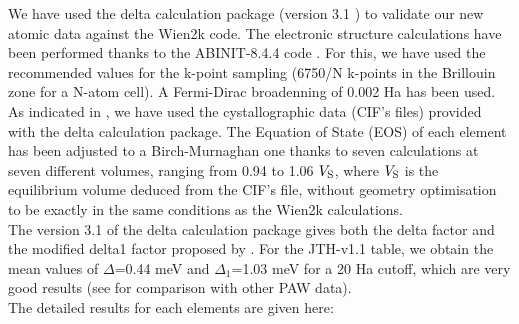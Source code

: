 \documentclass[10pt]{revtex4}
\begin{document}
We have used the delta calculation package (version 3.1 \cite{web1}) to validate our new atomic data against the Wien2k code. The electronic structure calculations have been performed thanks to the ABINIT-8.4.4 code \cite{Abinit16}. For this, we have used the recommended values \cite{Lejaeghere} for the k-point sampling (6750/N k-points in the Brillouin zone for a N-atom cell). A Fermi-Dirac broadenning of 0.002 Ha has been used. As indicated in \cite{Lejaeghere}, we have used the cystallographic data (CIF's files) provided with the delta calculation package. The Equation of State (EOS) of each element has been adjusted to a Birch-Murnaghan one thanks to seven calculations at seven different volumes, ranging from 0.94 to 1.06 $V_{\rm S}$, where $V_{\rm S}$ is the equilibrium volume deduced from the CIF's file, without geometry optimisation to be exactly in the same conditions as the Wien2k calculations.\\

The version 3.1 of the delta calculation package gives both the delta factor and the modified delta1 factor proposed by \cite{Jollet}.
For the JTH-v1.1 table, we obtain the mean values of $\Delta$=0.44 meV and $\Delta_1$=1.03 meV for a 20 Ha cutoff, which are very good results (see \cite{web1} for comparison with other PAW data).\\

\newpage
The detailed results for each elements are given here:\\
\end{document}
